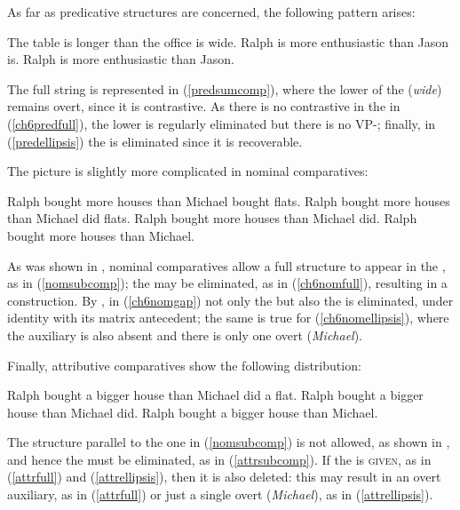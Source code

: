 As far as predicative structures are concerned, the following pattern arises:

\ea \label{predcomps}
\ea	The table is longer than the office is wide. \label{predsumcomp}
\ex	Ralph is more enthusiastic than Jason is. \label{ch6predfull}
\ex	Ralph is more enthusiastic than Jason. \label{predellipsis}
\z
\z

The full string is represented in (\ref{predsumcomp}), where the lower  of the  (\textit{wide}) remains overt, since it is contrastive. As there is no contrastive  in the  in (\ref{ch6predfull}), the lower  is regularly eliminated but there is no VP-; finally, in (\ref{predellipsis}) the  is eliminated since it is recoverable.

The picture is slightly more complicated in nominal comparatives:

\ea \label{nomcomps}
\ea	Ralph bought more houses than Michael bought flats. \label{nomsubcomp}
\ex	Ralph bought more houses than Michael did flats. \label{ch6nomfull}
\ex	Ralph bought more houses than Michael did. \label{ch6nomgap}
\ex	Ralph bought more houses than Michael. \label{ch6nomellipsis}
\z
\z

As was shown in , nominal comparatives allow a full structure to appear in the , as in (\ref{nomsubcomp}); the  may be eliminated, as in (\ref{ch6nomfull}), resulting in a  construction. By , in (\ref{ch6nomgap}) not only the  but also the  is eliminated, under identity with its matrix  antecedent; the same is true for (\ref{ch6nomellipsis}), where the auxiliary is also absent and there is only one overt  (\textit{Michael}).

Finally, attributive comparatives show the following distribution:

\ea \label{attrcomps}
\ea	Ralph bought a bigger house than Michael did a flat. \label{attrsubcomp}
\ex	Ralph bought a bigger house than Michael did. \label{attrfull}
\ex	Ralph bought a bigger house than Michael. \label{attrellipsis}
\z
\z

The structure parallel to the one in (\ref{nomsubcomp}) is not allowed, as shown in , and hence the  must be eliminated, as in (\ref{attrsubcomp}). If the  is \textsc{given}, as in (\ref{attrfull}) and (\ref{attrellipsis}), then it is also deleted: this may result in an overt auxiliary, as in (\ref{attrfull}) or just a single overt  (\textit{Michael}), as in (\ref{attrellipsis}).

